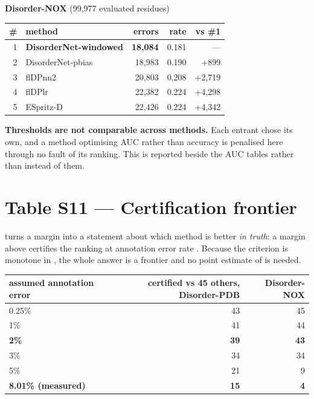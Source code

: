 \textbf{Disorder-NOX} (99,977 evaluated residues)

\begin{center}\footnotesize
\begin{tabular}{rlrrr}
\toprule
\textbf{\#} & \textbf{method} & \textbf{errors} & \textbf{rate} & \textbf{vs \#1} \\
\midrule
1 & \textbf{DisorderNet-windowed} & \textbf{18,084} & 0.181 & --- \\
2 & DisorderNet-pbias & 18,983 & 0.190 & +899 \\
3 & flDPnn2 & 20,803 & 0.208 & +2,719 \\
4 & flDPlr & 22,382 & 0.224 & +4,298 \\
5 & ESpritz-D & 22,426 & 0.224 & +4,342 \\
\bottomrule
\end{tabular}
\end{center}

\textbf{Thresholds are not comparable across methods.} Each entrant chose its own,
and a method optimising AUC rather than accuracy is penalised here through no
fault of its ranking. This is reported beside the AUC tables rather than instead
of them.


\section*{Table S11 --- Certification frontier}

 turns a margin into a statement about which
method is better \emph{in truth}: a margin above  certifies the ranking at
annotation error rate . Because the criterion is monotone in , the whole
answer is a frontier and no point estimate of  is needed.

\begin{center}\footnotesize
\begin{tabular}{lrr}
\toprule
\textbf{assumed annotation error} & \textbf{certified vs 45 others, Disorder-PDB} & \textbf{Disorder-NOX} \\
\midrule
0.25\% & 43 & 45 \\
1\% & 41 & 44 \\
\textbf{2\%} & \textbf{39} & \textbf{43} \\
3\% & 34 & 34 \\
5\% & 21 & 9 \\
\textbf{8.01\% (measured)} & \textbf{15} & \textbf{4} \\
\bottomrule
\end{tabular}
\end{center}

